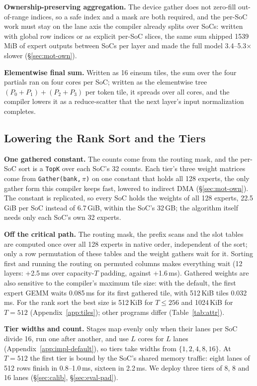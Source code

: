 \textbf{Ownership-preserving aggregation.} The device gather does not zero-fill out-of-range indices, so a safe index
and a mask are both required, and the per-SoC work must stay on the lane axis the compiler already splits over SoCs:
written with global row indices or as explicit per-SoC slices, the same sum shipped 1539\,MiB of expert outputs between
SoCs per layer and made the full model 3.4--5.3$\times$ slower (\S\ref{sec:mot-own}).

\textbf{Elementwise final sum.} Written as 16 einsum tiles, the sum over the four partials ran on four cores per SoC;
written as the elementwise tree $(P_0+P_1)+(P_2+P_3)$ per token tile, it spreads over all cores, and the compiler lowers it
as a reduce-scatter that the next layer's input normalization completes.

\subsection{Lowering the Rank Sort and the Tiers}
\label{sec:impl-cap}

\textbf{One gathered constant.} The counts come from the routing mask, and the per-SoC sort is a \texttt{TopK} over each
SoC's 32 counts. Each tier's three weight matrices come from \texttt{Gather(bank,$\,\pi$)} on one constant that holds all
128 experts, the only gather form this compiler keeps fast, lowered to indirect DMA (\S\ref{sec:mot-own}). The constant
is replicated, so every SoC holds the weights of all 128 experts, 22.5\,GiB per SoC instead of 6.7\,GiB, within the SoC's
32\,GB; the algorithm itself needs only each SoC's own 32 experts.

\textbf{Off the critical path.} The routing mask, the prefix scans and the slot tables are computed once over all 128
experts in native order, independent of the sort; only a row permutation of these tables and the weight gathers wait for
it. Sorting first and running the routing on permuted columns makes everything wait (12 layers: +2.5\,ms over
capacity-$T$ padding, against +1.6\,ms). Gathered weights are also sensitive to the compiler's maximum tile size: with the
default, the first expert GEMM waits 0.085\,ms for its first gathered tile, with 512\,KiB tiles 0.032\,ms. For the rank sort the best
size is 512\,KiB for $T\le256$ and 1024\,KiB for $T=512$ (Appendix~\ref{app:tiles}); other programs differ (Table~\ref{tab:attr}).

\textbf{Tier widths and count.} Stages map evenly only when their lanes per SoC divide 16, run one after another, and
use $L$ cores for $L$ lanes (Appendix~\ref{app:impl-default}), so tiers take widths from $\{1,2,4,8,16\}$. At $T=512$ the first tier
is bound by the SoC's shared memory traffic: eight lanes of 512 rows finish in 0.8--1.0\,ms, sixteen in 2.2\,ms. We
deploy three tiers of 8, 8 and 16 lanes (\S\ref{sec:calib}, \S\ref{sec:eval-pad}).

